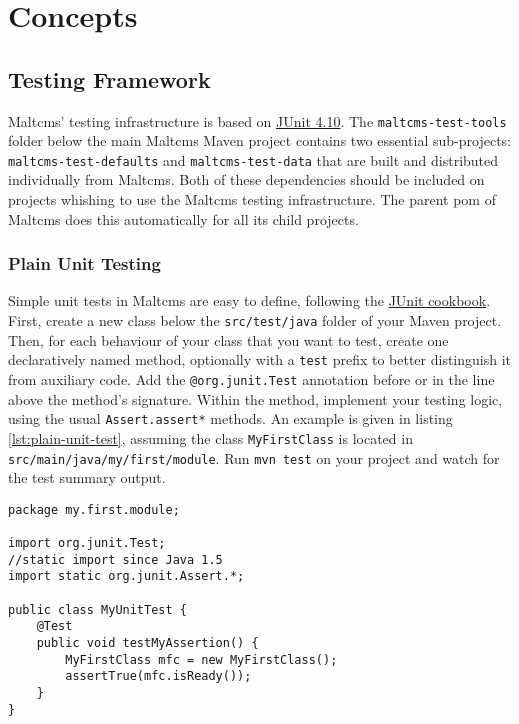 \chapter{Concepts}\label{cha:maltcms}

\section{Testing Framework}\label{sec:testing-framework}
Maltcms' testing infrastructure is based on \href{http://www.junit.org}{JUnit 4.10}. The \verb|maltcms-test-tools| folder below the main Maltcms 
Maven project contains two essential sub-projects: \verb|maltcms-test-defaults| and \verb|maltcms-test-data| that are built and distributed individually
from Maltcms. Both of these dependencies should be included on projects whishing to use the Maltcms testing infrastructure. The parent pom of Maltcms does 
this automatically for all its child projects.

\subsection{Plain Unit Testing}\label{sec:plain-unit-testing}
Simple unit tests in Maltcms are easy to define, following the \href{http://junit.sourceforge.net/doc/cookbook/cookbook.htm}{JUnit cookbook}. First,
create a new class below the \verb|src/test/java| folder of your Maven project. Then, for each behaviour of your class that you want to test, create 
one declaratively named method, optionally with a \verb|test| prefix to better distinguish it from auxiliary code. Add the \verb|@org.junit.Test| annotation
before or in the line above the method's signature. Within the method, implement your testing logic, using the usual \verb|Assert.assert*| methods. An example is given in listing \ref{lst:plain-unit-test}, assuming the class \verb|MyFirstClass| is located in \verb|src/main/java/my/first/module|.
Run \verb|mvn test| on your project and watch for the test summary output.

\begin{lstlisting}[caption={[Plain unit test]Example of a plain unit test},label=lst:plain-unit-test]
package my.first.module;

import org.junit.Test;
//static import since Java 1.5
import static org.junit.Assert.*;

public class MyUnitTest {	
	@Test
	public void testMyAssertion() {
		MyFirstClass mfc = new MyFirstClass();
		assertTrue(mfc.isReady());
	}
}
\end{lstlisting}

